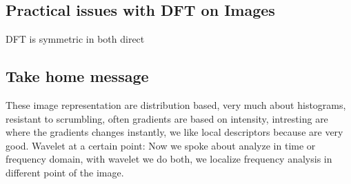 \documentclass[12pt]{book}
\begin{document}
\subsection{Practical issues with DFT on Images}
DFT is symmetric in both direct

\subsection{Take home message}
These image representation are distribution based, very much about histograms, resistant to scrumbling, often gradients are based on intensity, intresting are where the gradients changes instantly, we like local descriptors because are very good.
\newline
Wavelet at a certain point: Now we spoke about analyze in time or frequency domain, with wavelet we do both, we localize frequency analysis in different point of the image.
\end{document}
